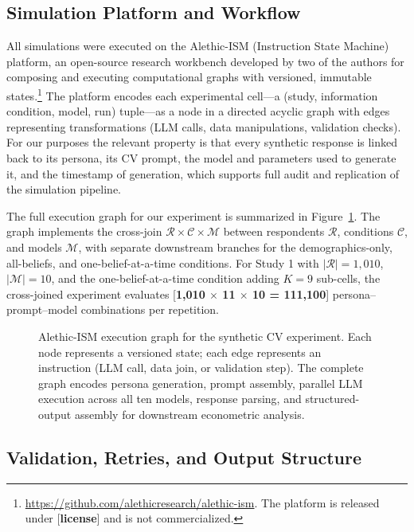 \documentclass[12pt]{article}
\begin{document}
\subsection{Simulation Platform and Workflow}\label{sec:methods-platform}

All simulations were executed on the Alethic-ISM (Instruction State Machine) platform, an open-source research workbench developed by two of the authors for composing and executing computational graphs with versioned, immutable states.\footnote{\url{https://github.com/alethicresearch/alethic-ism}. The platform is released under [\textbf{license}] and is not commercialized.}
The platform encodes each experimental cell---a (study, information
condition, model, run) tuple---as a node in a directed acyclic graph with
edges representing transformations (LLM calls, data manipulations,
validation checks). For our purposes the relevant property is that every
synthetic response is linked back to its persona, its CV prompt, the
model and parameters used to generate it, and the timestamp of generation,
which supports full audit and replication of the simulation pipeline.

The full execution graph for our experiment is summarized in
Figure~\ref{fig:graph}. The graph implements the cross-join $\mathcal{R}
\times \mathcal{C} \times \mathcal{M}$ between respondents $\mathcal{R}$,
conditions $\mathcal{C}$, and models $\mathcal{M}$, with separate
downstream branches for the demographics-only, all-beliefs, and
one-belief-at-a-time conditions. For Study 1 with $|\mathcal{R}| = 1{,}010$,
$|\mathcal{M}| = 10$, and the one-belief-at-a-time condition adding $K = 9$
sub-cells, the cross-joined experiment evaluates [\textbf{1{,}010 $\times$
11 $\times$ 10 = 111{,}100}] persona--prompt--model combinations per
repetition.

\begin{figure}[h]
    \centering
    \caption{Alethic-ISM execution graph for the synthetic CV experiment.
    Each node represents a versioned state; each edge represents an
    instruction (LLM call, data join, or validation step). The complete
    graph encodes persona generation, prompt assembly, parallel LLM
    execution across all ten models, response parsing, and
    structured-output assembly for downstream econometric analysis.}
    \label{fig:graph}
\end{figure}

\subsection{Validation, Retries, and Output Structure}\label{sec:methods-validation}
\end{document}
